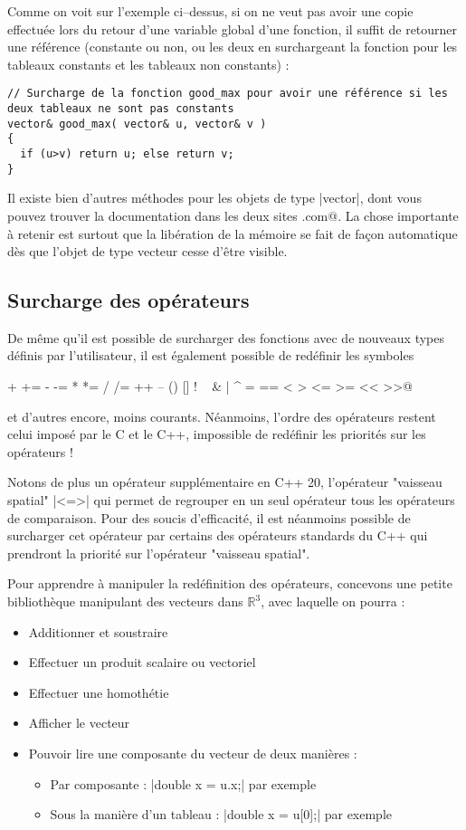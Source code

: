 Comme on voit sur l'exemple ci--dessus, si on ne veut pas avoir une copie effectuée lors du retour d'une variable global d'une fonction, il suffit de retourner une référence (constante ou non, ou les deux en surchargeant la fonction pour les tableaux constants et les tableaux non constants) :

\begin{lstlisting}
// Surcharge de la fonction good_max pour avoir une référence si les deux tableaux ne sont pas constants
vector& good_max( vector& u, vector& v )
{
  if (u>v) return u; else return v;
}
\end{lstlisting}


Il existe bien d'autres méthodes pour les objets de type |vector|, dont vous pouvez trouver la documentation dans les deux sites  \verb@cppreference@et \verb@cplusplus.com@. La chose importante à retenir est surtout que la libération de la mémoire se fait de façon automatique dès que l'objet de type vecteur cesse d'être visible.

\subsection{Surcharge des opérateurs}

De même qu'il est possible de surcharger des fonctions avec de nouveaux types définis par l'utilisateur, il est également possible
de redéfinir les symboles 

\begin{center}
\verb@+ += - -= * *= / /= ++ -- () [] ! ~ & | ^ = == < > <= >= << >>@
\end{center} 

et d'autres encore, moins courants. Néanmoins, l'ordre 
des opérateurs restent celui imposé par le C et le C++, impossible de redéfinir les priorités sur les opérateurs !

Notons de plus un opérateur supplémentaire en C++ 20, l'opérateur "vaisseau spatial" |<=>| qui permet de regrouper en un seul opérateur tous les opérateurs de comparaison. Pour des soucis d'efficacité, il est néanmoins possible de surcharger cet opérateur par certains des opérateurs standards du C++ qui prendront la priorité sur l'opérateur "vaisseau spatial".

Pour apprendre à manipuler la redéfinition des opérateurs, concevons une petite bibliothèque manipulant des vecteurs dans $\mathbb{R}^{3}$, avec laquelle on pourra :
\begin{itemize}
  \item Additionner et soustraire
  \item Effectuer un produit scalaire ou vectoriel
  \item Effectuer une homothétie
  \item Afficher le vecteur
  \item Pouvoir lire une composante du vecteur de deux manières :
  \begin{itemize}
    \item Par composante : |double x = u.x;| par exemple
    \item Sous la manière d'un tableau : |double x = u[0];| par exemple
  \end{itemize}
\end{itemize}

